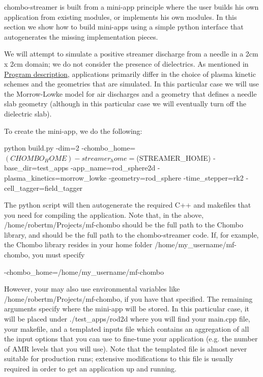 chombo-\/streamer is built from a mini-\/app principle where the user builds his own application from existing modules, or implements his own modules. In this section we show how to build mini-\/apps using a simple python interface that autogenerates the missing implementation pieces.

We will attempt to simulate a positive streamer discharge from a needle in a 2cm x 2cm domain; we do not consider the presence of dielectrics. As mentioned in \hyperlink{program-structure}{Program description}, applications primarily differ in the choice of plasma kinetic schemes and the geometries that are simulated. In this particular case we will use the Morrow-\/\+Lowke model for air discharges and a geometry that defines a needle slab geometry (although in this particular case we will eventually turn off the dielectric slab).

To create the mini-\/app, we do the following\+: \begin{DoxyVerb}  python build.py -dim=2 -chombo_home=$(CHOMBO_HOME) -streamer_home=$(STREAMER_HOME) -base_dir=test_apps -app_name=rod_sphere2d -plasma_kinetics=morrow_lowke -geometry=rod_sphere -time_stepper=rk2 -cell_tagger=field_tagger
\end{DoxyVerb}


The python script will then autogenerate the required C++ and makefiles that you need for compiling the application. Note that, in the above, /home/robertm/\+Projects/mf-\/chombo should be the full path to the Chombo library, and  should be the full path to the chombo-\/streamer code. If, for example, the Chombo library resides in your home folder /home/my\+\_\+username/mf-\/chombo, you must specify \begin{DoxyVerb}  -chombo_home=/home/my_username/mf-chombo
\end{DoxyVerb}


However, your may also use environmental variables like /home/robertm/\+Projects/mf-\/chombo, if you have that specified. The remaining arguments specify where the mini-\/app will be stored. In this particular case, it will be placed under ./test\+\_\+apps/rod2d where you will find your main.\+cpp file, your makefile, and a templated inputs file which contains an aggregation of all the input options that you can use to fine-\/tune your application (e.\+g. the number of A\+MR levels that you will use). Note that the templated file is almost never suitable for production runs; extensive modifications to this file is usually required in order to get an application up and running.

